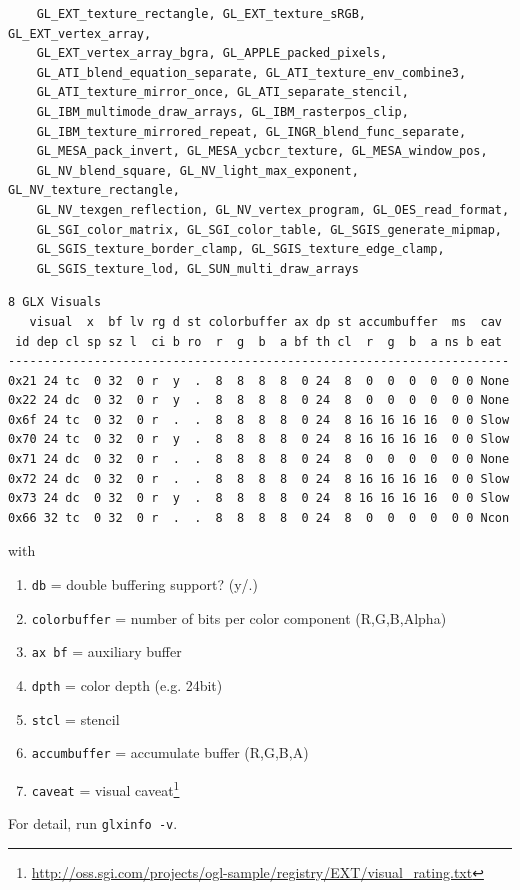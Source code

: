 \begin{verbatim}
    GL_EXT_texture_rectangle, GL_EXT_texture_sRGB, GL_EXT_vertex_array, 
    GL_EXT_vertex_array_bgra, GL_APPLE_packed_pixels, 
    GL_ATI_blend_equation_separate, GL_ATI_texture_env_combine3, 
    GL_ATI_texture_mirror_once, GL_ATI_separate_stencil, 
    GL_IBM_multimode_draw_arrays, GL_IBM_rasterpos_clip, 
    GL_IBM_texture_mirrored_repeat, GL_INGR_blend_func_separate, 
    GL_MESA_pack_invert, GL_MESA_ycbcr_texture, GL_MESA_window_pos, 
    GL_NV_blend_square, GL_NV_light_max_exponent, GL_NV_texture_rectangle, 
    GL_NV_texgen_reflection, GL_NV_vertex_program, GL_OES_read_format, 
    GL_SGI_color_matrix, GL_SGI_color_table, GL_SGIS_generate_mipmap, 
    GL_SGIS_texture_border_clamp, GL_SGIS_texture_edge_clamp, 
    GL_SGIS_texture_lod, GL_SUN_multi_draw_arrays
\end{verbatim}

\begin{verbatim}
8 GLX Visuals
   visual  x  bf lv rg d st colorbuffer ax dp st accumbuffer  ms  cav
 id dep cl sp sz l  ci b ro  r  g  b  a bf th cl  r  g  b  a ns b eat
----------------------------------------------------------------------
0x21 24 tc  0 32  0 r  y  .  8  8  8  8  0 24  8  0  0  0  0  0 0 None
0x22 24 dc  0 32  0 r  y  .  8  8  8  8  0 24  8  0  0  0  0  0 0 None
0x6f 24 tc  0 32  0 r  .  .  8  8  8  8  0 24  8 16 16 16 16  0 0 Slow
0x70 24 tc  0 32  0 r  y  .  8  8  8  8  0 24  8 16 16 16 16  0 0 Slow
0x71 24 dc  0 32  0 r  .  .  8  8  8  8  0 24  8  0  0  0  0  0 0 None
0x72 24 dc  0 32  0 r  .  .  8  8  8  8  0 24  8 16 16 16 16  0 0 Slow
0x73 24 dc  0 32  0 r  y  .  8  8  8  8  0 24  8 16 16 16 16  0 0 Slow
0x66 32 tc  0 32  0 r  .  .  8  8  8  8  0 24  8  0  0  0  0  0 0 Ncon
\end{verbatim}
with
\begin{enumerate}
\item \verb!db! = double buffering support? (y/.)
\item \verb!colorbuffer! = number of bits per color component
  (R,G,B,Alpha) 
\item \verb!ax bf! = auxiliary buffer
\item \verb!dpth! = color depth (e.g. 24bit)
\item \verb!stcl! = stencil 
\item \verb!accumbuffer! = accumulate buffer (R,G,B,A)
\item \verb!caveat! = visual caveat\footnote{\url{http://oss.sgi.com/projects/ogl-sample/registry/EXT/visual_rating.txt}}
\end{enumerate}
For detail, run \verb!glxinfo -v!. 


